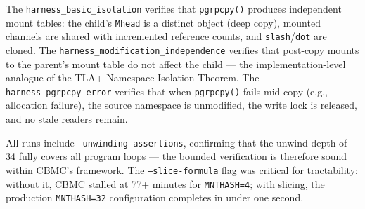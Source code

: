 \documentclass[acmsmall,screen,review]{acmart}
\begin{document}
The \texttt{harness\_basic\_isolation} verifies that \texttt{pgrpcpy()} produces
independent mount tables: the child's \texttt{Mhead} is a distinct object (deep copy),
mounted channels are shared with incremented reference counts, and \texttt{slash}/\texttt{dot}
are cloned. The \texttt{harness\_modification\_independence} verifies that post-copy
mounts to the parent's mount table do not affect the child --- the implementation-level
analogue of the TLA+ Namespace Isolation Theorem. The \texttt{harness\_pgrpcpy\_error}
verifies that when \texttt{pgrpcpy()} fails mid-copy (e.g., allocation failure), the
source namespace is unmodified, the write lock is released, and no stale readers remain.

All runs include \texttt{--unwinding-assertions}, confirming that the unwind depth of 34
fully covers all program loops --- the bounded verification is therefore sound within
CBMC's framework. The \texttt{--slice-formula} flag was critical for tractability:
without it, CBMC stalled at 77+ minutes for \texttt{MNTHASH=4}; with slicing, the
production \texttt{MNTHASH=32} configuration completes in under one second.



\end{document}
